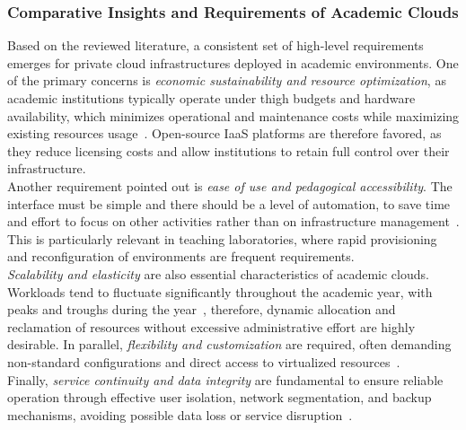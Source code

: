 \documentclass[sigplan]{acmart}
\begin{document}
        \subsubsection{Comparative Insights and Requirements of Academic Clouds}
            Based on the reviewed literature, a consistent set of high-level requirements emerges for private cloud infrastructures deployed in academic environments. One of the primary concerns is \textit{economic sustainability and resource optimization}, as academic institutions typically operate under thigh budgets and hardware availability, which minimizes operational and maintenance costs while maximizing existing resources usage~\cite{lynnComparativeStudyCurrent2015, alvesUsingCloudBuild2014, vijayakumarPrivateCloudInfrastructure2025}. Open-source IaaS platforms are therefore favored, as they reduce licensing costs and allow institutions to retain full control over their infrastructure.\\

            Another requirement pointed out is \textit{ease of use and pedagogical accessibility}. The interface must be simple and there should be a level of automation, to save time and effort to focus on other activities rather than on infrastructure management~\cite{bonnerUsingOpenStackImprove2013, oleksiukExperienceMaintenanceAcademic2021}. This is particularly relevant in teaching laboratories, where rapid provisioning and reconfiguration of environments are frequent requirements.\\

            \textit{Scalability and elasticity} are also essential characteristics of academic clouds. Workloads tend to fluctuate significantly throughout the academic year, with peaks and troughs during the year~\cite{sheelaDeployingOpenStackCloud2017}, therefore, dynamic allocation and reclamation of resources without excessive administrative effort are highly desirable. In parallel, \textit{flexibility and customization} are required, often demanding non-standard configurations and direct access to virtualized resources~\cite{vijayakumarPrivateCloudInfrastructure2025}.\\

            Finally, \textit{service continuity and data integrity} are fundamental to ensure reliable operation through effective user isolation, network segmentation, and backup mechanisms, avoiding possible data loss or service disruption~\cite{oleksiukExperienceMaintenanceAcademic2021}.\\
            
\end{document}

